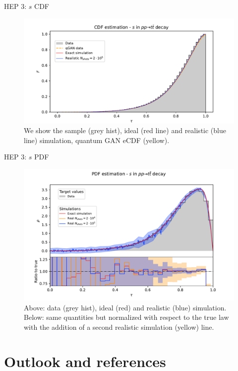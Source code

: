 \documentclass[8pt, xcolor={svgnames}, hyperref={colorlinks, linkcolor=black, citecolor=amethyst, urlcolor=amethyst}]{beamer}
\begin{document}
\begin{frame}[fragile]{HEP 3: $s$ CDF}
\begin{figure}
  \centering
  \includegraphics[width=1\linewidth]{figures/CDF_s_20_20_200000.pdf}
  \caption{We show the sample (grey hist), ideal (red line) and realistic 
  (blue line) simulation, quantum GAN eCDF (yellow).}
\end{figure}
\end{frame}

\begin{frame}[fragile]{HEP 3: $s$ PDF}
\begin{figure}
  \centering
  \includegraphics[width=1\linewidth]{figures/PDF_s_20_20_200000.pdf}
  \caption{Above: data (grey hist), ideal (red) and realistic (blue) simulation. 
  Below: same quantities but normalized
  with respect to the true law with the addition of a second realistic simulation
  (yellow) line.}
\end{figure}
\end{frame}

\section{Outlook and references}
\end{document}
